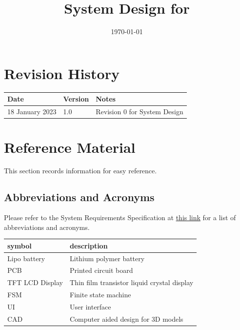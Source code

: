 \documentclass[12pt, titlepage]{article}
\begin{document}
\title{System Design for \progname{}} 
\author{\authname}
\date{\today}

\maketitle


\section{Revision History}

\begin{tabularx}{\textwidth}{p{3cm}p{2cm}X}
\toprule {\bf Date} & {\bf Version} & {\bf Notes}\\
\midrule
18 January 2023 & 1.0 & Revision 0 for System Design\\
\bottomrule
\end{tabularx}

\newpage

\section{Reference Material}

This section records information for easy reference.

\subsection{Abbreviations and Acronyms}
Please refer to the System Requirements Specification at \href{https://github.com/zakerl/Capstone_Project/blob/desDoc_Labeeb/docs/SRS/SRS.pdf}{this link} for a list of abbreviations and acronyms.\\

\renewcommand{\arraystretch}{1.2}
\begin{tabular}{l l} 
  \toprule		
  \textbf{symbol} & \textbf{description}\\
  \midrule 
	Lipo battery & Lithium polymer battery\\
	PCB & Printed circuit board\\
	TFT LCD Display & Thin film transistor liquid crystal display\\
	FSM & Finite state machine\\
	UI & User interface\\
	CAD & Computer aided design for 3D models\\

  \bottomrule
\end{tabular}\\
\end{document}
